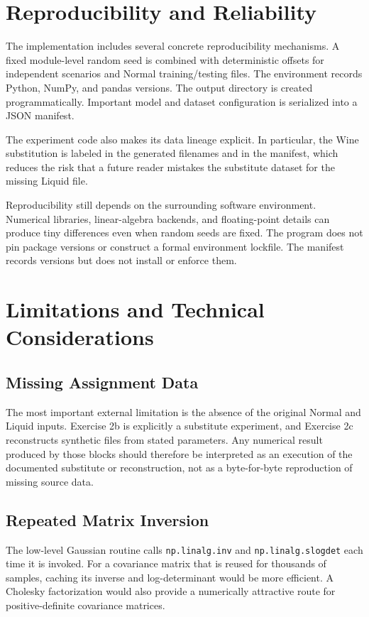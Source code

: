\documentclass[11pt,a4paper]{article}
\newcommand{\code}[1]{\texttt{#1}}
\begin{document}
\section{Reproducibility and Reliability}
The implementation includes several concrete reproducibility mechanisms. A fixed module-level random seed is combined with deterministic offsets for independent scenarios and Normal training/testing files. The environment records Python, NumPy, and pandas versions. The output directory is created programmatically. Important model and dataset configuration is serialized into a JSON manifest.

The experiment code also makes its data lineage explicit. In particular, the Wine substitution is labeled in the generated filenames and in the manifest, which reduces the risk that a future reader mistakes the substitute dataset for the missing Liquid file.

Reproducibility still depends on the surrounding software environment. Numerical libraries, linear-algebra backends, and floating-point details can produce tiny differences even when random seeds are fixed. The program does not pin package versions or construct a formal environment lockfile. The manifest records versions but does not install or enforce them.

\section{Limitations and Technical Considerations}

\subsection{Missing Assignment Data}
The most important external limitation is the absence of the original Normal and Liquid inputs. Exercise 2b is explicitly a substitute experiment, and Exercise 2c reconstructs synthetic files from stated parameters. Any numerical result produced by those blocks should therefore be interpreted as an execution of the documented substitute or reconstruction, not as a byte-for-byte reproduction of missing source data.

\subsection{Repeated Matrix Inversion}
The low-level Gaussian routine calls \code{np.linalg.inv} and \code{np.linalg.slogdet} each time it is invoked. For a covariance matrix that is reused for thousands of samples, caching its inverse and log-determinant would be more efficient. A Cholesky factorization would also provide a numerically attractive route for positive-definite covariance matrices.
\end{document}
